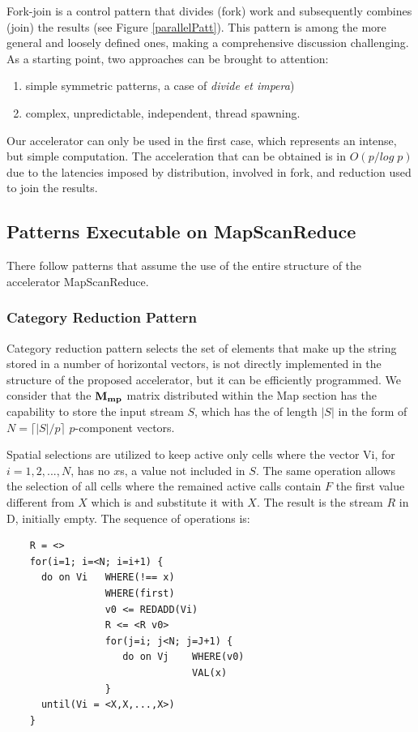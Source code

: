 Fork-join is a control pattern that divides (fork)  work and subsequently combines (join) the results (see Figure \ref{parallelPatt}). This pattern is among the more general and loosely defined ones, making a comprehensive discussion challenging. As a starting point, two approaches can be brought to attention:
\begin{enumerate}
    \item simple symmetric patterns, a case of {\em divide et impera})
    \item complex, unpredictable, independent, thread spawning.
\end{enumerate}
Our accelerator can only be used  in the first case, which represents an intense, but simple computation.
The acceleration that can be obtained is in $O(p/log \; p)$ due to the latencies imposed by distribution, involved in fork, and reduction used to join the results.

\subsection{Patterns Executable on MapScanReduce}

There follow   patterns that assume the use of the entire structure of the accelerator MapScanReduce.

\subsubsection{Category Reduction Pattern}

Category reduction pattern selects the set of elements that make up the string stored in a number of horizontal vectors,  is not directly implemented in the structure of the proposed accelerator, but it can be efficiently programmed. We consider that  the ${\bf M_{mp}}$ matrix distributed within the Map section has the capability to store the input stream $S$, which has the  of length $|S|$ in the form of  $N = \lceil |S|/p \rceil$ $p$-component vectors.

Spatial selections are utilized to keep active only cells where the vector Vi, for $i = 1, 2, ...,N$, has no $x$s, a value not included in $S$.  The same operation allows the selection of all cells where the remained active calls contain $F$ the first value different from $X$ which is and substitute it with $X$. The result is the stream $R$ in D, initially empty. The sequence of operations is:
\begin{verbatim}
    R = <>
    for(i=1; i=<N; i=i+1) {
      do on Vi   WHERE(!== x)
                 WHERE(first)
                 v0 <= REDADD(Vi)
                 R <= <R v0>
                 for(j=i; j<N; j=J+1) {
                    do on Vj    WHERE(v0)
                                VAL(x)     
                 }
      until(Vi = <X,X,...,X>)              
    }
\end{verbatim}

